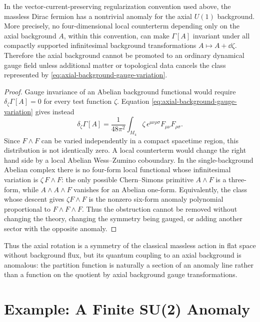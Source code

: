 \begin{proposition}
\label{prop:axial-background-obstruction}
In the vector-current-preserving regularization convention used above, the
massless Dirac fermion has a nontrivial anomaly for the axial \(U(1)\)
background.  More precisely, no four-dimensional local counterterm depending
only on the axial background \(A\), within this convention, can make
\(\Gamma[A]\) invariant under all compactly supported infinitesimal
background transformations \(A\mapsto A+\dd\zeta\).  Therefore the axial
background cannot be promoted to an ordinary dynamical gauge field unless
additional matter or topological data cancels the class represented by
\eqref{eq:axial-background-gauge-variation}.
\end{proposition}

\begin{proof}
Gauge invariance of an Abelian background functional would require
\(\delta_\zeta\Gamma[A]=0\) for every test function \(\zeta\).  Equation
\eqref{eq:axial-background-gauge-variation} gives instead
\[
  \delta_\zeta\Gamma[A]
  =
  \frac1{48\pi^2}
  \int_{M_4}\zeta\,\epsilon^{\mu\nu\rho\sigma}
  F_{\mu\nu}F_{\rho\sigma}.
\]
Since \(F\wedge F\) can be varied independently in a compact spacetime
region, this distribution is not identically zero.  A local counterterm would
change the right hand side by a local Abelian Wess--Zumino coboundary.  In the
single-background Abelian complex there is no four-form local functional
whose infinitesimal variation is \(\zeta\,F\wedge F\): the only possible
Chern--Simons primitive \(A\wedge F\) is a three-form, while \(A\wedge
A\wedge F\) vanishes for an Abelian one-form.  Equivalently, the class
whose descent gives \(\zeta F\wedge F\) is the nonzero six-form anomaly
polynomial proportional to \(F\wedge F\wedge F\).  Thus the obstruction
cannot be removed without changing the theory, changing the symmetry being
gauged, or adding another sector with the opposite anomaly.
\end{proof}

Thus the axial rotation is a symmetry of the classical massless action in
flat space without background flux, but its quantum coupling to an axial
background is anomalous: the partition function is naturally a section of an
anomaly line rather than a function on the quotient by axial background gauge
transformations.

\section{Example: A Finite SU(2) Anomaly}

